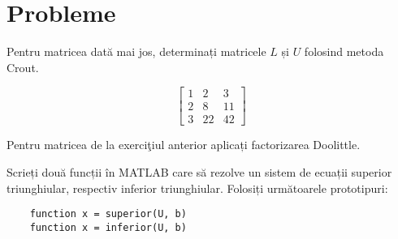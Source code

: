 \documentclass{exam}
\begin{document}
\newpage
\section{Probleme}

\begin{questions}
	\boxedpoints
	\pointsinmargin

	\question Pentru matricea dată mai jos, determinați matricele $L$ și $U$
	folosind metoda Crout.

	\begin{equation*}
		\begin{bmatrix}
			1 & 2  & 3  \\
			2 & 8  & 11 \\
			3 & 22 & 42
		\end{bmatrix}
	\end{equation*}

	\question Pentru matricea de la exerciţiul anterior aplicați factorizarea
	Doolittle.

	\question Scrieți două funcții în MATLAB care să rezolve un sistem de
	ecuații superior triunghiular, respectiv inferior triunghiular. Folosiți
	următoarele prototipuri:

	\begin{verbatim}
	function x = superior(U, b)
	function x = inferior(U, b)
	\end{verbatim}

\end{questions}
\end{document}
